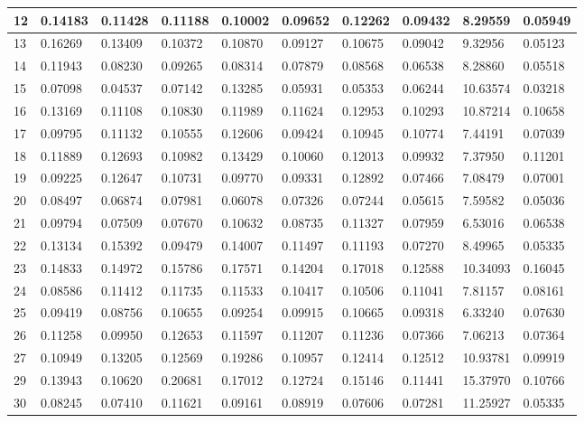 \begin{table}[H]
{\begin{tabular}{|l|l|l|l|l|l|l|l|l|l|}
        12 & 0.14183 & 0.11428 & 0.11188 & 0.10002 & 0.09652 & 0.12262 & 0.09432 & 8.29559 & 0.05949 \\ \hline
        13 & 0.16269 & 0.13409 & 0.10372 & 0.10870 & 0.09127 & 0.10675 & 0.09042 & 9.32956 & 0.05123 \\ \hline
        14 & 0.11943 & 0.08230 & 0.09265 & 0.08314 & 0.07879 & 0.08568 & 0.06538 & 8.28860 & 0.05518 \\ \hline
        15 & 0.07098 & 0.04537 & 0.07142 & 0.13285 & 0.05931 & 0.05353 & 0.06244 & 10.63574 & 0.03218 \\ \hline
        16 & 0.13169 & 0.11108 & 0.10830 & 0.11989 & 0.11624 & 0.12953 & 0.10293 & 10.87214 & 0.10658 \\ \hline
        17 & 0.09795 & 0.11132 & 0.10555 & 0.12606 & 0.09424 & 0.10945 & 0.10774 & 7.44191 & 0.07039 \\ \hline
        18 & 0.11889 & 0.12693 & 0.10982 & 0.13429 & 0.10060 & 0.12013 & 0.09932 & 7.37950 & 0.11201 \\ \hline
        19 & 0.09225 & 0.12647 & 0.10731 & 0.09770 & 0.09331 & 0.12892 & 0.07466 & 7.08479 & 0.07001 \\ \hline
        20 & 0.08497 & 0.06874 & 0.07981 & 0.06078 & 0.07326 & 0.07244 & 0.05615 & 7.59582 & 0.05036 \\ \hline
        21 & 0.09794 & 0.07509 & 0.07670 & 0.10632 & 0.08735 & 0.11327 & 0.07959 & 6.53016 & 0.06538 \\ \hline
        22 & 0.13134 & 0.15392 & 0.09479 & 0.14007 & 0.11497 & 0.11193 & 0.07270 & 8.49965 & 0.05335 \\ \hline
        23 & 0.14833 & 0.14972 & 0.15786 & 0.17571 & 0.14204 & 0.17018 & 0.12588 & 10.34093 & 0.16045 \\ \hline
        24 & 0.08586 & 0.11412 & 0.11735 & 0.11533 & 0.10417 & 0.10506 & 0.11041 & 7.81157 & 0.08161 \\ \hline
        25 & 0.09419 & 0.08756 & 0.10655 & 0.09254 & 0.09915 & 0.10665 & 0.09318 & 6.33240 & 0.07630 \\ \hline
        26 & 0.11258 & 0.09950 & 0.12653 & 0.11597 & 0.11207 & 0.11236 & 0.07366 & 7.06213 & 0.07364 \\ \hline
        27 & 0.10949 & 0.13205 & 0.12569 & 0.19286 & 0.10957 & 0.12414 & 0.12512 & 10.93781 & 0.09919 \\ \hline
        29 & 0.13943 & 0.10620 & 0.20681 & 0.17012 & 0.12724 & 0.15146 & 0.11441 & 15.37970 & 0.10766 \\ \hline
        30 & 0.08245 & 0.07410 & 0.11621 & 0.09161 & 0.08919 & 0.07606 & 0.07281 & 11.25927 & 0.05335 \\ \hline

\end{tabular}}
\end{table}
